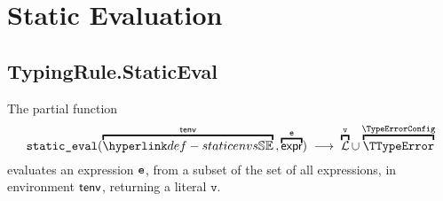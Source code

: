 \documentclass{book}
\newcommand\literals[0]{\mathcal{L}}
\newcommand\staticeval[0]{\texttt{static\_eval}}
\newcommand\vv[0]{\texttt{v}}
\begin{document}
\chapter{Static Evaluation}

\section{TypingRule.StaticEval}
The partial function
\[
  \staticeval(\overname{\staticenvs}{\tenv} \aslsep \overname{\expr}{\ve}) \;\aslto\;
  \overname{\literals}{\vv} \cup \overname{\TTypeError}{\TypeErrorConfig}
\]
evaluates an expression $\texttt{e}$, from a subset of the set of all expressions, in environment $\textsf{tenv}$, returning a literal $\vv$.

\begin{emptyformal}

\end{emptyformal}
\end{document}
